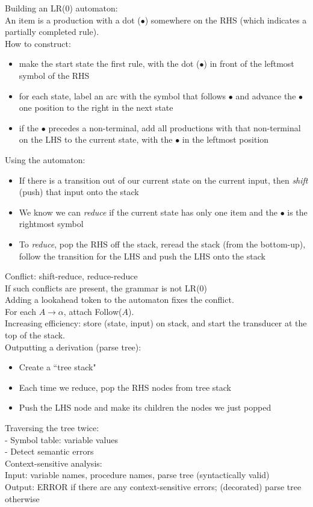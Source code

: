 \documentclass[12pt]{article}
\begin{document}
\noindent
Building an LR(0) automaton:\\
An item is a production with a dot ($\bullet$) somewhere on the RHS (which indicates a partially completed rule).\\
How to construct:
\begin{itemize}
	\renewcommand\labelitemi{--}
	\item make the start state the first rule, with the dot ($\bullet$) in front of the leftmost symbol of the RHS
	\item for each state, label an arc with the symbol that follows $\bullet$ and advance the $\bullet$ one position to the right in the next state
	\item if the $\bullet$ precedes a non-terminal, add all productions with that non-terminal on the LHS to the current state, with the $\bullet$ in the leftmost position
\end{itemize}
Using the automaton:
\begin{itemize}
	\renewcommand\labelitemi{--}
	\item If there is a transition out of our current state on the current input, then \emph{shift} (push) that input onto the stack
	\item We know we can \emph{reduce} if the current state has only one item and the $\bullet$ is the rightmost symbol
	\item To \emph{reduce}, pop the RHS off the stack, reread the stack (from the bottom-up), follow the transition for the LHS and push the LHS onto the stack
\end{itemize}
Conflict: shift-reduce, reduce-reduce\\
If such conflicts are present, the grammar is not LR(0)\\
Adding a lookahead token to the automaton fixes the conflict.\\
For each $A \rightarrow \alpha$, attach Follow($A$).\\
Increasing efficiency: store (state, input) on stack, and start the transducer at the top of the stack.\\

\clearpage
Outputting a derivation (parse tree):
\begin{itemize}
	\renewcommand\labelitemi{--}
	\item Create a ``tree stack"
	\item Each time we reduce, pop the RHS nodes from tree stack
	\item Push the LHS node and make its children the nodes we just popped
\end{itemize}
Traversing the tree twice:\\
- Symbol table: variable values\\
- Detect semantic errors\\
Context-sensitive analysis:\\
Input: variable names, procedure names, parse tree (syntactically valid)\\
Output: ERROR if there are any context-sensitive errors; (decorated) parse tree otherwise\\
\end{document}
